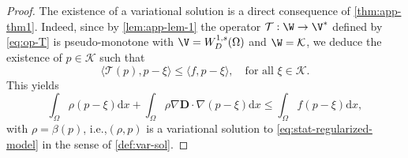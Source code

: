 \documentclass[final,reqno]{amsart}
\theoremstyle{plain}
\theoremstyle{definition}
\theoremstyle{remark}
\numberwithin{remark}{section}	%
\numberwithin{example}{section}	%
\newcommand{\de}{\mathbf{D}}
\newcommand{\K}{\mathcal K}
\newcommand{\Om}{\Omega}
\newcommand{\T}{\mathcal T}
\newcommand{\ie}{i.e.,\xspace}	%
\newcommand{\dd}{\mathrm{d}}
\begin{document}
\begin{proof}
    The existence of a variational solution is a direct consequence of \cref{thm:app-thm1}. Indeed, since by \cref{lem:app-lem-1} the operator $\T:\W\to\V^{*}$ defined by \eqref{eq:op-T} is pseudo-monotone with $\V = W^{1,s}_{D}(\Om)$ and $\W=\K$, we deduce the existence of $p\in\K$ such that
    \[
    \langle\T(p),p-\xi\rangle \leq \langle f,p-\xi\rangle, \quad \text{for all } \xi\in \K.
    \]
    This yields
    \begin{equation}
        \int_{\Om}\rho (p-\xi) \dd x + \int_{\Omega} \rho\nabla\de\cdot\nabla(p-\xi)\dd x \leq \int_{\Om} f(p-\xi)\dd x,
    \end{equation}
    with $\rho = \beta(p)$, \ie $(\rho,p)$ is a variational solution to \eqref{eq:stat-regularized-model} in the sense of \cref{def:var-sol}.
	

\end{proof}
\end{document}
